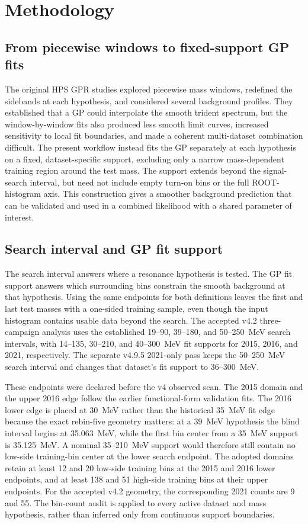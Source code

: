 \section{Methodology}
\label{sec:methodology}

\subsection{From piecewise windows to fixed-support GP fits}

The original HPS GPR studies explored piecewise mass windows, redefined the sidebands
at each hypothesis, and considered several background profiles. They established that
a GP could interpolate the smooth trident spectrum, but the window-by-window fits also
produced less smooth limit curves, increased sensitivity to local fit boundaries, and
made a coherent multi-dataset combination difficult. The present workflow instead fits
the GP separately at each hypothesis on a fixed, dataset-specific support, excluding
only a narrow mass-dependent training region around the test mass. The support extends
beyond the signal-search interval, but need not include empty turn-on bins or the full
ROOT-histogram axis. This construction gives a smoother background prediction that can
be validated and used in a combined likelihood with a shared parameter of interest.

\subsection{Search interval and GP fit support}
\label{sec:fit-support-policy}

The search interval answers where a resonance hypothesis is tested. The GP fit support
answers which surrounding bins constrain the smooth background at that hypothesis.
Using the same endpoints for both definitions leaves the first and last test masses
with a one-sided training sample, even though the input histogram contains usable
data beyond the search. The accepted v4.2 three-campaign analysis uses the established
19--90, 39--180, and 50--250~MeV search intervals, with 14--135, 30--210, and
40--300~MeV fit supports for 2015, 2016, and 2021, respectively. The separate v4.9.5
2021-only pass keeps the 50--250~MeV search interval and changes that dataset's fit
support to 36--300~MeV.

These endpoints were declared before the v4 observed scan. The 2015 domain and the
upper 2016 edge follow the earlier functional-form validation fits. The 2016 lower
edge is placed at 30~MeV rather than the historical 35~MeV fit edge because the exact
rebin-five geometry matters: at a 39~MeV hypothesis the blind interval begins at
35.063~MeV, while the first bin center from a 35~MeV support is 35.125~MeV. A nominal
35--210~MeV support would therefore still contain no low-side training-bin center at
the lower search endpoint. The adopted domains retain at least 12 and 20 low-side
training bins at the 2015 and 2016 lower endpoints, and at least 138 and 51 high-side
training bins at their upper endpoints. For the accepted v4.2 geometry, the
corresponding 2021 counts are 9 and 55.
The bin-count audit is applied to every active dataset and mass hypothesis, rather
than inferred only from continuous support boundaries.

